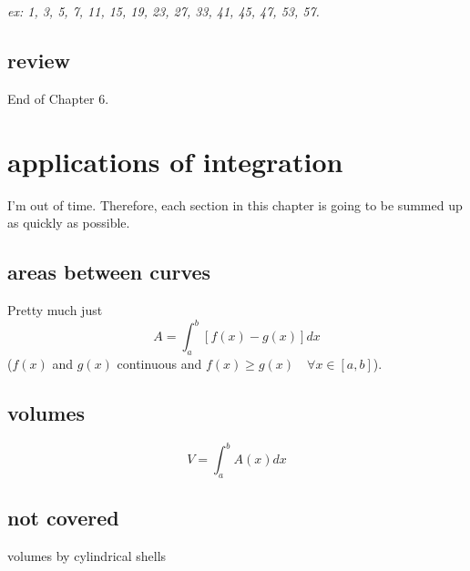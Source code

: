\documentclass[10pt,a4paper]{report}
\begin{document}
\emph{ex: 1, 3, 5, 7, 11, 15, 19, 23, 27, 33, 41, 45, 47, 53, 57.}


\section*{review}

End of Chapter 6.










































\chapter{applications of integration}

I'm out of time. Therefore, each section in this chapter is going to be summed up as quickly as possible.

\section{areas between curves}

Pretty much just
$$
	A = \int_a^b [f(x) - g(x)] dx
$$
($f(x)$ and $g(x)$ continuous and $f(x) \geq g(x) \quad \forall x \in [a, b]$).



\section{volumes}

$$
	V = \int_a^b A(x) dx
$$

\section{not covered}

volumes by cylindrical shells
\end{document}
